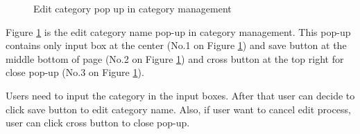 \documentclass[12pt,oneside,openright,a4paper]{cpe-english-project}
\begin{document}
		\begin{figure}[!h]\centering
			\caption{Edit category pop up in category management}\label{fig:Edit_category_pop_up_in_category_management_done}
		\end{figure}
		\begin{flushleft}
			Figure \ref*{fig:Edit_category_pop_up_in_category_management_done} is the edit category name pop-up in category management. This pop-up contains only input box at the center (No.1 on Figure \ref*{fig:Edit_category_pop_up_in_category_management_done}) and save button at the middle bottom of page (No.2 on Figure \ref*{fig:Edit_category_pop_up_in_category_management_done}) and cross button at the top right for close pop-up (No.3 on Figure \ref*{fig:Edit_category_pop_up_in_category_management_done}).
		\end{flushleft}
		\begin{flushleft}
			Users need to input the category in the input boxes. After that user can decide to click save button to edit category name. Also, if user want to cancel edit process, user can click cross button to close pop-up.
		\end{flushleft}
\end{document}

